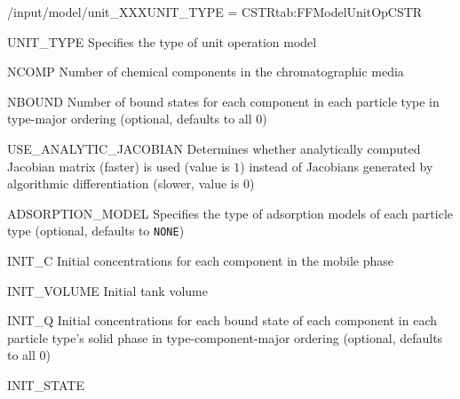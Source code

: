 \begin{condsubgroup}{/input/model/unit\_XXX}{UNIT\_TYPE = CSTR}{tab:FFModelUnitOpCSTR}
  \begin{dataset}[type=string,range={\texttt{CSTR}},length=1]{UNIT\_TYPE}
    Specifies the type of unit operation model
  \end{dataset}
  \begin{dataset}[type=int,range={$\geq 1$},length=1]{NCOMP}
    Number of chemical components in the chromatographic media
  \end{dataset}
  \begin{dataset}[type=int,range={$\geq 0$},length={$\texttt{NPARTYPE} \cdot \texttt{NCOMP}$}]{NBOUND}
    Number of bound states for each component in each particle type in type-major ordering (optional, defaults to all $0$)
  \end{dataset}
  \begin{dataset}[type=int,range={$\{0, 1\}$},length=1]{USE\_ANALYTIC\_JACOBIAN}
    Determines whether analytically computed Jacobian matrix (faster) is used (value is $1$) instead of Jacobians generated by algorithmic differentiation (slower, value is $0$)
  \end{dataset}
  \begin{dataset}[type=string,range={See Section~\ref{sec:FFAdsorption}},length={\texttt{NPARTYPE}}]{ADSORPTION\_MODEL}
    Specifies the type of adsorption models of each particle type (optional, defaults to \texttt{NONE})
  \end{dataset}
  \begin{dataset}[unit=\si{\mol\per\cubic\metre\of{IV}},type=double,range={$\geq 0$},length={\texttt{NCOMP}}]{INIT\_C}
    Initial concentrations for each component in the mobile phase
  \end{dataset}
  \begin{dataset}[unit=\si{\cubic\metre},type=double,range={$\geq 0$},length=1]{INIT\_VOLUME}
    Initial tank volume
  \end{dataset}
  \begin{dataset}[unit=\si{\mol\per\cubic\metre\of{SP}},type=double,range={$\geq 0$},length={\texttt{NTOTALBND}}]{INIT\_Q}
    Initial concentrations for each bound state of each component in each particle type's solid phase in type-component-major ordering (optional, defaults to all $0$)
  \end{dataset}
  \begin{dataset}[unit=various,type=double,range={$\mathds{R}$},length={\texttt{NDOF} / $2\texttt{NDOF}$}]{INIT\_STATE}

\end{dataset}
\end{condsubgroup}
